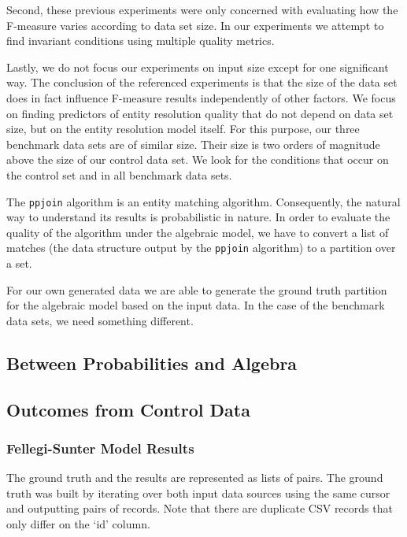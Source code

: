 Second, these previous experiments were only concerned with evaluating how the
F-measure varies according to data set size.
In our experiments we attempt to find invariant conditions using multiple
quality metrics.

Lastly, we do not focus our experiments on input size except for one significant
way.
The conclusion of the referenced experiments is that the size of the data set
does in fact influence F-measure results independently of other factors.
We focus on finding predictors of entity resolution quality that do not depend
on data set size, but on the entity resolution model itself.
For this purpose, our three benchmark data sets are of similar size.
Their size is two orders of magnitude above the size of our control data set.
We look for the conditions that occur on the control set and in all benchmark
data sets.

The \texttt{ppjoin} algorithm is an entity matching algorithm.
Consequently, the natural way to understand its results is probabilistic in
nature.
In order to evaluate the quality of the algorithm under the algebraic model, we
have to convert a list of matches (the data structure output by the
\texttt{ppjoin} algorithm) to a partition over a set.

For our own generated data we are able to generate the ground truth partition
for the algebraic model based on the input data.
In the case of the benchmark data sets, we need something different.

\subsection{Between Probabilities and Algebra}\label{subsec:Probabilities to Algebra}


\subsection{Outcomes from Control Data}\label{subsec:Control Data}

\subsubsection{Fellegi-Sunter Model Results}\label{subsubsec:F-S Results}

The ground truth and the results are represented as lists of pairs.
The ground truth was built by iterating over both input data sources using
the same cursor and outputting pairs of records.
Note that there are duplicate CSV records that only differ on the `id' column.

